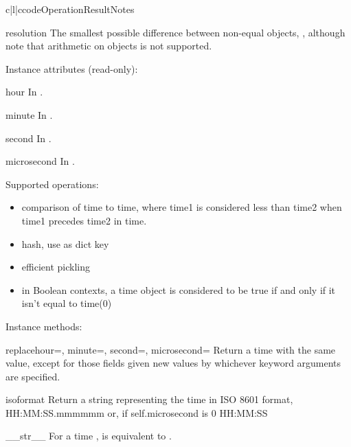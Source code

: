 \begin{tableiii}{c|l|c}{code}{Operation}{Result}{Notes}
\begin{memberdesc}{resolution}
        The smallest possible difference between non-equal 
        objects, , although note that
        arithmetic on  objects is not supported.
\end{memberdesc}

Instance attributes (read-only):

\begin{memberdesc}{hour}
In .
\end{memberdesc}
\begin{memberdesc}{minute}     
In .
\end{memberdesc}
\begin{memberdesc}{second}         
In .
\end{memberdesc}
\begin{memberdesc}{microsecond}    
In .
\end{memberdesc}

Supported operations:

\begin{itemize}
  \item
    comparison of time to time, where time1 is considered
    less than time2 when time1 precedes time2 in time.

  \item
    hash, use as dict key

  \item
    efficient pickling

  \item
    in Boolean contexts, a time object is considered to be true
    if and only if it isn't equal to time(0)
\end{itemize}

Instance methods:

\begin{methoddesc}{replace}{hour=, minute=, second=, microsecond=}
    Return a time with the same value, except for those fields given
    new values by whichever keyword arguments are specified.
\end{methoddesc}

\begin{methoddesc}{isoformat}{}
    Return a string representing the time in ISO 8601 format,
        HH:MM:SS.mmmmmm
    or, if self.microsecond is 0
        HH:MM:SS
\end{methoddesc}

\begin{methoddesc}{__str__}{}
    For a time ,  is equivalent to
    .
\end{methoddesc}


\end{tableiii}
